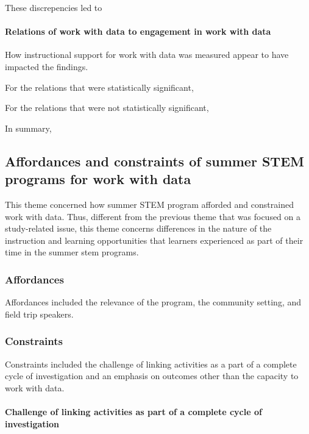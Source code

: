 \documentclass[]{book}
\let\oldparagraph\paragraph
\renewcommand{\paragraph}[1]{\oldparagraph{#1}\mbox{}}
\theoremstyle{definition}
\theoremstyle{definition}
\theoremstyle{definition}
\theoremstyle{remark}
\begin{document}
These discrepencies led to

\paragraph{Relations of work with data to engagement in work with
data}\label{relations-of-work-with-data-to-engagement-in-work-with-data}

How instructional support for work with data was measured appear to have
impacted the findings.

For the relations that were statistically significant,

For the relations that were not statistically significant,

In summary,

\subsection{Affordances and constraints of summer STEM programs for work
with
data}\label{affordances-and-constraints-of-summer-stem-programs-for-work-with-data}

This theme concerned how summer STEM program afforded and constrained
work with data. Thus, different from the previous theme that was focused
on a study-related issue, this theme concerns differences in the nature
of the instruction and learning opportunities that learners experienced
as part of their time in the summer stem programs.

\subsubsection{Affordances}\label{affordances}

Affordances included the relevance of the program, the community
setting, and field trip speakers.

\subsubsection{Constraints}\label{constraints}

Constraints included the challenge of linking activities as a part of a
complete cycle of investigation and an emphasis on outcomes other than
the capacity to work with data.

\paragraph{Challenge of linking activities as part of a complete cycle
of
investigation}\label{challenge-of-linking-activities-as-part-of-a-complete-cycle-of-investigation}
\end{document}
